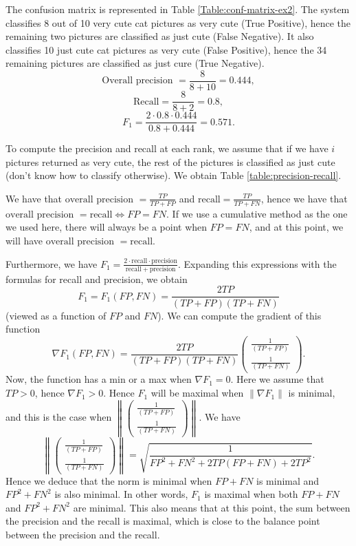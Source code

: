 \documentclass[fontsize=12pt, usenames, dvipsnames, headinclude, headsepline, footinclude, footsepline]{scrartcl}
\begin{document}
  \begin{sol}
    The confusion matrix is represented in Table \ref{Table:conf-matrix-ex2}. The system classifies 8 out of
    10 very cute cat pictures as very cute (True Positive), hence the remaining two pictures are classified as
    just cute (False Negative). It also classifies 10 just cute cat pictures as very cute (False Positive),
    hence the 34 remaining pictures are classified as just cure (True Negative).
    \[ \text{Overall precision } =  \frac{8}{8 + 10} = 0.444,\]
    \[ \mathrm{Recall} = \frac{8}{8+2} = 0.8, \]
    \[ F_1 = \frac{2 \cdot 0.8 \cdot 0.444}{0.8 + 0.444} = 0.571. \]

    To compute the precision and recall at each rank, we assume that if we have $i$ pictures returned as very
    cute, the rest of the pictures is classified as just cute (don't know how to classify otherwise). We
    obtain Table \ref{table:precision-recall}.

    We have that $\text{overall precision } = \frac{TP}{TP + FP}$ and $\mathrm{recall} = \frac{TP}{TP + FN}$,
    hence we have that $\text{overall precision } = \mathrm{recall} \iff FP = FN$. If we use a cumulative
    method as the one we used here, there will always be a point when $FP = FN$, and at this point, we will
    have $\text{overall precision } = \mathrm{recall}$.

    Furthermore, we have $F_1 = \frac{2 \cdot \mathrm{recall} \cdot \text{precision}}{\mathrm{recall} +
      \mathrm{precision}}$. Expanding this expressions with the formulas for recall and precision, we obtain 
    \[ F_1 = F_1(FP, FN) = \frac{2TP}{(TP + FP)(TP + FN)} \]
    (viewed as a function of $FP$ and $FN$). We can compute the gradient of this function 
    \[ \nabla F_1(FP, FN) = \frac{2TP}{(TP+FP)(TP+FN)} \begin{pmatrix} \frac{1}{(TP + FP)} \\ \frac{1}{(TP +
          FN)} \end{pmatrix}. \]
    Now, the function has a min or a max when $\nabla F_1 = 0$. Here we assume that $TP > 0$, hence $\nabla
    F_1 > 0$. Hence $F_1$ will be maximal when $\|\nabla F_1\|$ is minimal, and this is the case when 
    $\left\|\begin{pmatrix} \frac{1}{(TP + FP)} \\ \frac{1}{(TP + FN)} \end{pmatrix}\right\|$. We have 
    \[ \left\|\begin{pmatrix} \frac{1}{(TP + FP)} \\ \frac{1}{(TP + FN)} \end{pmatrix}\right\| =
      \sqrt{\frac{1}{FP^2 + FN^2 + 2TP(FP + FN) + 2TP^2}}. \]
    Hence we deduce that the norm is minimal when $FP + FN$ is minimal and $FP^2 + FN^2$ is also minimal. In
    other words, $F_1$ is maximal when both $FP + FN$ and $FP^2 + FN^2$ are minimal. This also means that at
    this point, the sum between the precision and the recall is maximal, which is close to the balance point
    between the precision and the recall.
  \end{sol}
\end{document}
